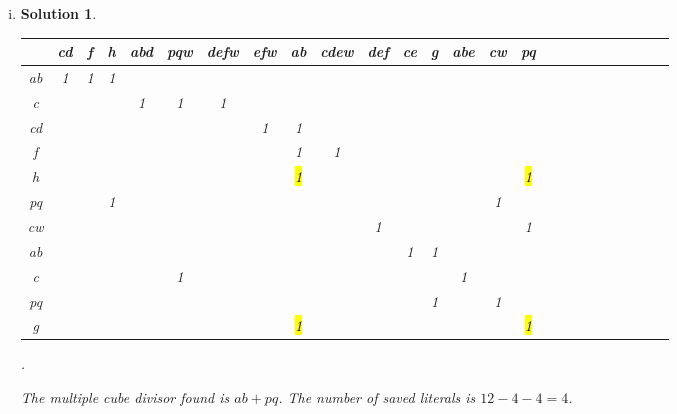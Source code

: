 \documentclass[acmlarge,screen=true,anonymous=false,11pt]{acmart}
\newtheorem*{solution*}{Solution}
\begin{document}
\begin{enumerate}[(i)]
\item \begin{solution*}
    \begin{tabular}{c|cccccccccccccccccccccccc}
        & cd & f & h & abd & pqw & defw & efw & ab & cdew & def & ce & g & abe & cw & pq  \\\midrule
        ab  &  1 & 1 & 1 &     &     &      &     &    &      &     &    &   &     &    &    \\
        c   &    &   &   &  1  &  1  &   1  &     &    &      &     &    &   &     &    &    \\
        cd  &    &   &   &     &     &      &  1  &  1 &      &     &    &   &     &    &    \\
        f   &    &   &   &     &     &      &     &  1 &   1  &     &    &   &     &    &    \\
        h   &    &   &   &     &     &      &     &  \hl{1} &      &     &    &   &     &    &  \hl{1}  \\
        pq  &    &   & 1 &     &     &      &     &    &      &     &    &   &     &  1 &    \\
        cw  &    &   &   &     &     &      &     &    &      &   1 &    &   &     &    &  1 \\\midrule
        ab  &    &   &   &     &     &      &     &    &      &     & 1  &  1&     &    &    \\
        c   &    &   &   &     &  1  &      &     &    &      &     &    &   &  1  &    &    \\
        pq  &    &   &   &     &     &      &     &    &      &     &    & 1 &     &  1 &    \\
        g   &    &   &   &     &     &      &     &  \hl{1} &      &     &    &   &     &    & \hl{1}
    \end{tabular}.

The multiple cube divisor found is $ab+pq$. The number of saved literals is $12 - 4 - 4 = 4$.
\end{solution*}
\end{enumerate}
\end{document}
